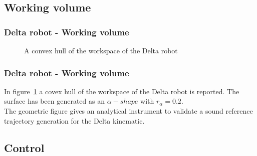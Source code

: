 \subsection{Working volume}
\begin{frame}
\frametitle{Delta robot - Working volume}
\begin{figure}
	\caption{A convex hull of the workspace of the Delta robot}
	\label{fig:Delta_WS}
\end{figure}
\end{frame}
%
\begin{frame}
\frametitle{Delta robot - Working volume}
In figure~\ref{fig:Delta_WS} a covex hull of the workspace of the Delta robot is reported. The surface has been generated as an $\alpha-shape$  with $r_\alpha = 0.2$.\\
The geometric figure gives an analytical instrument to validate a sound reference trajectory generation for the Delta kinematic.
\end{frame}
%
\subsection{Control}
